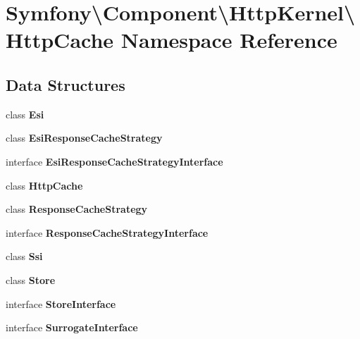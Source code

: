 \section{Symfony\textbackslash{}Component\textbackslash{}Http\+Kernel\textbackslash{}Http\+Cache Namespace Reference}
\label{namespace_symfony_1_1_component_1_1_http_kernel_1_1_http_cache}
\subsection*{Data Structures}
\begin{DoxyCompactItemize}
\item 
class {\bf Esi}
\item 
class {\bf Esi\+Response\+Cache\+Strategy}
\item 
interface {\bf Esi\+Response\+Cache\+Strategy\+Interface}
\item 
class {\bf Http\+Cache}
\item 
class {\bf Response\+Cache\+Strategy}
\item 
interface {\bf Response\+Cache\+Strategy\+Interface}
\item 
class {\bf Ssi}
\item 
class {\bf Store}
\item 
interface {\bf Store\+Interface}
\item 
interface {\bf Surrogate\+Interface}
\end{DoxyCompactItemize}

